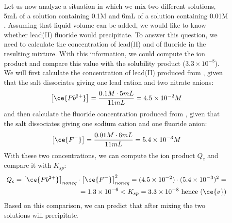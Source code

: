 \documentclass[main.tex]{subfiles}
\begin{document}
\begin{description}
\item[] 
Let us now analyze a situation in which we mix two different solutions, 5mL of a solution containing 0.1M  and 6mL of a solution containing 0.01M . Assuming that liquid volume can be added, we would like to know whether lead(II) fluoride would precipitate. To answer this question, we need to calculate the concentration of lead(II) and of fluoride in the resulting mixture. With this information, we could compute the ion product and compare this value with the solubility product ($3.3\times10^{-8}$). We will first calculate the concentration of lead(II) produced from , given that the salt dissociates giving one lead cation and two nitrate anions:
\[ \big[ \ce{Pb^{2+}} \big]=\frac{0.1M\cdot 5mL}{11mL}=4.5\times 10^{-2}M\]
and then calculate the fluoride concentration produced from , given that the salt dissociates giving one sodium cation and one fluoride anion:
\begin{equation*}\big[ \ce{F^{-}} \big]=\frac{0.01M\cdot 6mL}{11mL}=5.4\times 10^{-3}M\end{equation*}
With these two concentrations, we can compute the ion product $Q_c$ and compare it with $K_{sp}$:
\begin{equation*}\begin{split}Q_{c}=\big[ \ce{Pb^{2+}} \big]_{noneq}\cdot \big[ \ce{F^{-}} \big]^2_{noneq}=(4.5\times 10^{-2})\cdot(5.4\times 10^{-3})^2=\\=1.3\times 10^{-6}< K_{sp}=3.3\times10^{-8} \text{ hence } (\ce{v})	\end{split}\end{equation*}
Based on this comparison, we can predict that after mixing the two solutions  will precipitate.


\end{description}
\end{document}
